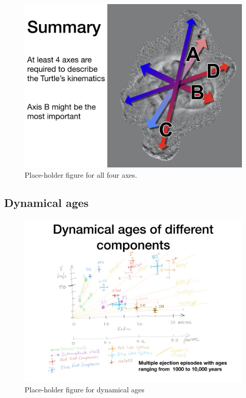 \documentclass[useAMS, usenatbib]{mnras}
\begin{document}
\begin{figure}
  \includegraphics[width=\linewidth]
  {talk-figs/turtle-talk-morelia-2020-02-export-014}
  \caption{Place-holder figure for all four axes.}
  \label{fig:flow-axes-ABCD}
\end{figure}

\subsection{Dynamical ages}
\label{sec:dynamical-ages}

\begin{figure}
  \includegraphics[width=\linewidth]
  {talk-figs/turtle-talk-morelia-2020-02-export-013}
  \caption{Place-holder figure for dynamical ages}
  \label{fig:ages}
\end{figure}







\bsp	%
\label{lastpage}
\end{document}
